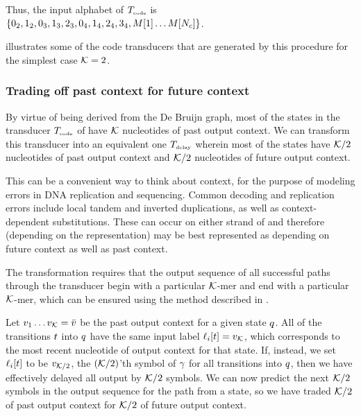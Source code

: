 \documentclass[english]{article}
\begin{document}
Thus, the input alphabet of $T_{\mbox{\tiny code}}$
is $\{ 0_2, 1_2,
       0_3, 1_3, 2_3,
       0_4, 1_4, 2_4, 3_4,
       M[{1}] \ldots M[{N_c}] \}$.

 illustrates some of the code transducers that are generated by this procedure for the simplest case ${\cal K}=2$.
       
\subsubsection{Trading off past context for future context}

By virtue of being derived from the De Bruijn graph,
most of the states in the transducer $T_{\mbox{\tiny code}}$ of 
have ${\cal K}$ nucleotides of past output context.
We can transform this transducer into an equivalent one $T_{\mbox{\tiny delay}}$ wherein most of the states have
${\cal K}/2$ nucleotides of past output context
and ${\cal K}/2$ nucleotides of future output context.

This can be a convenient way to think about context, for the purpose of modeling errors in DNA replication and sequencing.
Common decoding and replication errors include local tandem and inverted duplications, as well as context-dependent substitutions.
These can occur on either strand of and therefore (depending on the representation) may be best represented as depending
on future context as well as past context.

The transformation requires that the output sequence of all successful paths through the transducer
begin with a particular ${\cal K}$-mer and end with a particular ${\cal K}$-mer,
which can be ensured using the method described in .

Let $v_{1} \ldots v_{{\cal K}} = \bar{v}$ be the past output context for a given state $q$.
All of the transitions $t$ into $q$ have the same input label $\ell_i[t] = v_{{\cal K}}$,
which corresponds to the most recent nucleotide of output context for that state.
If, instead, we set $\ell_i[t]$ to be $v_{{\cal K}/2}$, the $({\cal K}/2)$'th symbol of $\gamma$
for all transitions into $q$, then we have effectively delayed all output by ${\cal K}/2$ symbols.
We can now predict the next ${\cal K}/2$ symbols in the output sequence for the path from a state,
so we have traded ${\cal K}/2$ of past output context for ${\cal K}/2$ of future output context.
\end{document}
